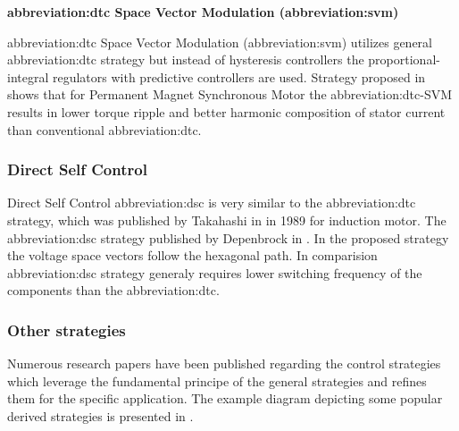 \documentclass[a4paper, twoside, 11pt]{article}
\begin{document}
            \vspace*{0.85cm}
             \hspace*{-\parindent} \textbf{\gls{abbreviation:dtc} Space Vector Modulation (\gls{abbreviation:svm})}\par
            \hspace*{\parindent} \gls{abbreviation:dtc} Space Vector Modulation (\gls{abbreviation:svm}) utilizes general \gls{abbreviation:dtc} strategy but instead of hysteresis controllers the proportional-integral regulators with predictive controllers are used. Strategy proposed in \cite{swierczynski-dsp-based-direct-torque-control-of-permanent-magnet-synchronous-motor-using-space-vector-modulation-dtcsvm} shows that for Permanent Magnet Synchronous Motor the \gls{abbreviation:dtc}-SVM results in lower torque ripple and better harmonic composition of stator current than conventional \gls{abbreviation:dtc}.

        \subsubsection{Direct Self Control}
            Direct Self Control \gls{abbreviation:dsc} is very similar to the \gls{abbreviation:dtc} strategy, which was published by Takahashi in \cite{takahashi-high-performance-direct-torque-control-of-an-iduction-motor} in 1989 for induction motor. The \gls{abbreviation:dsc} strategy published by Depenbrock in \cite{depenbrock-direct-self-control-of-inverter-fed-induction-machine}. In the proposed strategy the voltage space vectors follow the hexagonal path. In comparision \gls{abbreviation:dsc} strategy generaly requires lower switching frequency of the components than the \gls{abbreviation:dtc}.

        \subsubsection{Other strategies}
            Numerous research papers have been published regarding the control strategies which leverage the fundamental principe of the general strategies and refines them for the specific application. The example diagram depicting some popular derived strategies is presented in \cite{heidari-a-review-of-synchronour-relucatence-motor-drive-advancements}.
\end{document}
